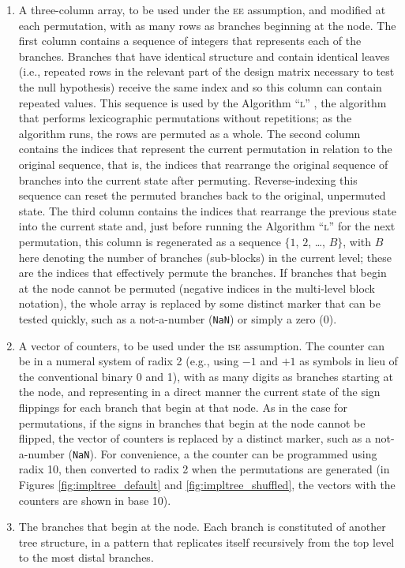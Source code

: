 \begin{enumerate}
\item A three-column array, to be used under the \textsc{ee} assumption, and modified at each permutation, with as many rows as branches beginning at the node. The first column contains a sequence of integers that represents each of the branches. Branches that have identical structure and contain identical leaves (i.e., repeated rows in the relevant part of the design matrix necessary to test the null hypothesis) receive the same index and so this column can contain repeated values. This sequence is used by the Algorithm ``\textsc{l}'' \citep{Knuth2005}, the algorithm that performs lexicographic permutations without repetitions; as the algorithm runs, the rows are permuted as a whole. The second column contains the indices that represent the current permutation in relation to the original sequence, that is, the indices that rearrange the original sequence of branches into the current state after permuting. Reverse-indexing this sequence can reset the permuted branches back to the original, unpermuted state. The third column contains the indices that rearrange the previous state into the current state and, just before running the Algorithm ``\textsc{l}'' for the next permutation, this column is regenerated as a sequence $\{1$, $2$, \ldots, $B\}$, with $B$ here denoting the number of branches (sub-blocks) in the current level; these are the indices that effectively permute the branches. If branches that begin at the node cannot be permuted (negative indices in the multi-level block notation), the whole array is replaced by some distinct marker that can be tested quickly, such as a not-a-number (\texttt{NaN}) or simply a zero (0).
\item A vector of counters, to be used under the \textsc{ise} assumption. The counter can be in a numeral system of radix 2 (e.g., using $-1$ and $+1$ as symbols in lieu of the conventional binary 0 and 1), with as many digits as branches starting at the node, and representing in a direct manner the current state of the sign flippings for each branch that begin at that node. As in the case for permutations, if the signs in branches that begin at the node cannot be flipped, the vector of counters is replaced by a distinct marker, such as a not-a-number (\texttt{NaN}). For convenience, a the counter can be programmed using radix 10, then converted to radix 2 when the permutations are generated (in Figures \ref{fig:impltree_default} and \ref{fig:impltree_shuffled}, the vectors with the counters are shown in base 10).
\item The branches that begin at the node. Each branch is constituted of another tree structure, in a pattern that replicates itself recursively from the top level to the most distal branches.
\end{enumerate}

